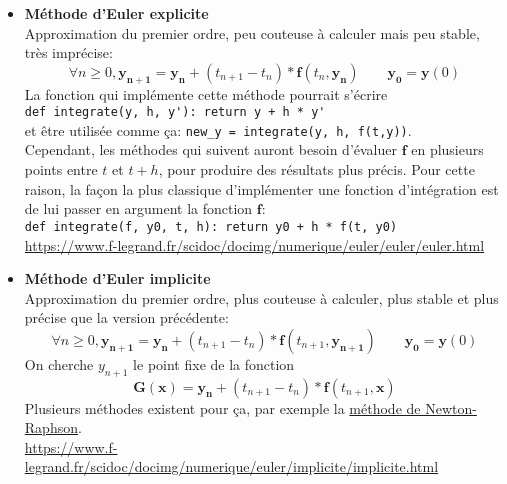 \documentclass{article}
\newcommand{\myvec}[1]{\ensuremath{\mathbf{#1}}}
\begin{document}
\vspace{1em}

\begin{itemize}
    \item \textbf{Méthode d'Euler explicite} \\
    Approximation du premier ordre, peu couteuse à calculer mais peu stable, très imprécise:
    \begin{equation*}
        \forall n \ge 0, \myvec{y_{n+1}} = \myvec{y_n} + (t_{n+1} - t_n) * \myvec{f}(t_n, \myvec{y_n}) \quad\quad \myvec{y_0} = \myvec{y}(0)
    \end{equation*}
    La fonction qui implémente cette méthode pourrait s'écrire\\
    \verb!def integrate(y, h, y'): return y + h * y'!\\
    et être utilisée comme ça: \verb!new_y = integrate(y, h, f(t,y))!. \\
    Cependant, les méthodes qui suivent auront besoin d'évaluer $\myvec{f}$ en plusieurs points entre $t$ et $t+h$, pour produire des résultats plus précis. Pour cette raison, la façon la plus classique d'implémenter une fonction d'intégration est de lui passer en argument la fonction $\myvec{f}$:\\
    \verb!def integrate(f, y0, t, h): return y0 + h * f(t, y0)!\\
    \url{https://www.f-legrand.fr/scidoc/docimg/numerique/euler/euler/euler.html}

    \item \textbf{Méthode d'Euler implicite} \\
    Approximation du premier ordre, plus couteuse à calculer, plus stable et plus précise que la version précédente:
    \begin{equation*}
        \forall n \ge 0, \myvec{y_{n+1}} = \myvec{y_n} + (t_{n+1} - t_n) * \myvec{f}(t_{n+1}, \myvec{y_{n+1}}) \quad\quad \myvec{y_0} = \myvec{y}(0)
    \end{equation*}
    On cherche $y_{n+1}$ le point fixe de la fonction
        \[\myvec{G}(\myvec{x}) = \myvec{y_n} + (t_{n+1} - t_n) * \myvec{f}(t_{n+1}, \myvec{x})\]
    Plusieurs méthodes existent pour ça, par exemple la \href{https://en.wikipedia.org/wiki/Newton\%27s_method}{méthode de Newton-Raphson}. \\
    \url{https://www.f-legrand.fr/scidoc/docimg/numerique/euler/implicite/implicite.html}


\end{itemize}
\end{document}
